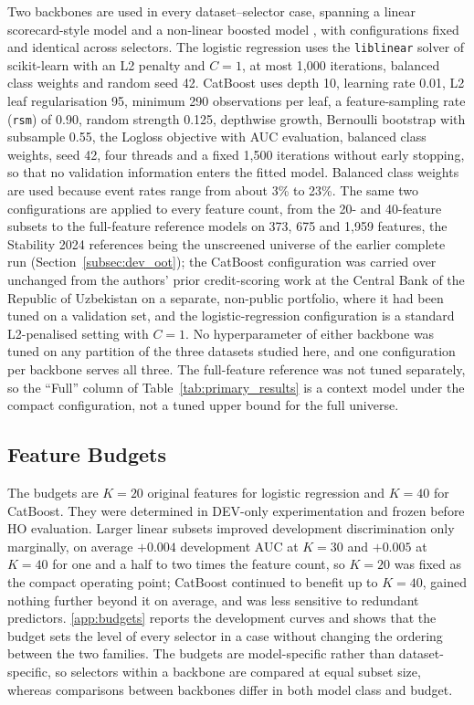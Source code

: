 \documentclass[final,5p,twocolumn]{elsarticle}
\newcommand{\Kfeat}{K}
\begin{document}
Two backbones are used in every dataset--selector case, spanning a linear scorecard-style model and a non-linear boosted model \cite{lessmann2015,gunnarsson2021}, with configurations fixed and identical across selectors. The logistic regression uses the \texttt{liblinear} solver of scikit-learn \cite{pedregosa2011} with an L2 penalty and $C=1$, at most 1,000 iterations, balanced class weights and random seed 42. CatBoost \cite{prokhorenkova2018} uses depth 10, learning rate 0.01, L2 leaf regularisation 95, minimum 290 observations per leaf, a feature-sampling rate (\texttt{rsm}) of 0.90, random strength 0.125, depthwise growth, Bernoulli bootstrap with subsample 0.55, the Logloss objective with AUC evaluation, balanced class weights, seed 42, four threads and a fixed 1,500 iterations without early stopping, so that no validation information enters the fitted model. Balanced class weights are used because event rates range from about 3\% to 23\%. The same two configurations are applied to every feature count, from the 20- and 40-feature subsets to the full-feature reference models on 373, 675 and 1,959 features, the Stability 2024 references being the unscreened universe of the earlier complete run (Section~\ref{subsec:dev_oot}); the CatBoost configuration was carried over unchanged from the authors' prior credit-scoring work at the Central Bank of the Republic of Uzbekistan on a separate, non-public portfolio, where it had been tuned on a validation set, and the logistic-regression configuration is a standard L2-penalised setting with $C=1$. No hyperparameter of either backbone was tuned on any partition of the three datasets studied here, and one configuration per backbone serves all three. The full-feature reference was not tuned separately, so the ``Full'' column of Table~\ref{tab:primary_results} is a context model under the compact configuration, not a tuned upper bound for the full universe.

\subsection{Feature Budgets}
\label{subsec:feature_budgets}

The budgets are $\Kfeat=20$ original features for logistic regression and $\Kfeat=40$ for CatBoost. They were determined in DEV-only experimentation and frozen before HO evaluation. Larger linear subsets improved development discrimination only marginally, on average $+0.004$ development AUC at $\Kfeat=30$ and $+0.005$ at $\Kfeat=40$ for one and a half to two times the feature count, so $\Kfeat=20$ was fixed as the compact operating point; CatBoost continued to benefit up to $\Kfeat=40$, gained nothing further beyond it on average, and was less sensitive to redundant predictors. \ref{app:budgets} reports the development curves and shows that the budget sets the level of every selector in a case without changing the ordering between the two families. The budgets are model-specific rather than dataset-specific, so selectors within a backbone are compared at equal subset size, whereas comparisons between backbones differ in both model class and budget.
\end{document}
